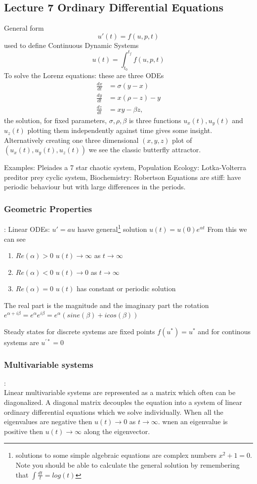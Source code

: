 \subsection{Lecture 7 Ordinary Differential Equations} General form
\[u'(t) = f(u,p,t)\]
used to define Continuous Dynamic Systems
\[u(t) = \int^{t_f}_{t_0}  f(u,p,t)\]
To solve the Lorenz equations: these are three ODEs
\[\begin{array}{rl}
\frac{dx}{dt} &= \sigma(y-x) \\
\frac{dy}{dt} &= x(\rho-z)-y \\
\frac{dz}{dt} &= xy-\beta z,
\end{array} \]
the solution, for fixed parameters, $\sigma,\rho,\beta$  is three functions $u_x(t),u_y(t)$ and $u_z(t)$ plotting them independently against time gives some insight. Alternatively creating one three dimensional $(x,y,z)$  plot of $(u_x(t),u_y(t),u_z(t))$ we see the classic  butterfly attractor.

Examples: Pleiades  a 7 star chaotic system, Population Ecology: Lotka-Volterra preditor prey  cyclic system, Biochemistry: Robertson Equations are stiff: have  periodic behaviour but with  large differences in the periods.



\subsubsection*{Geometric Properties}:
Linear ODEs: $u'= au$ hasve general\footnote{solutions to some simple algebraic equations are complex numbers $x^2 +1 = 0$. Note you should be able to calculate the general solution by remembering that $\int\frac{dt}{t}= log(t)$} 
solution $u(t) = u(0)e^{\alpha t}$ From this we can see
\begin{enumerate}
\item $Re(\alpha)> 0 $ $u(t)\rightarrow \infty$ as $t \rightarrow \infty$
\item $Re(\alpha)< 0 $ $u(t)\rightarrow 0$ as $t \rightarrow \infty$
\item $Re(\alpha)= 0 $ $u(t)$ has constant or periodic solution
\end{enumerate}
The real part is the magnitude and the imaginary part the rotation $e^{\alpha+i\beta} =e^{\alpha}e^{i\beta} = e^{\alpha}(sine(\beta)+ i cos(\beta))$

Steady states for discrete systems are fixed points $f(u^*)= u^*$ and for continous systems are $u^{\prime *} = 0$


\subsubsection*{Multivariable systems}:\\
Linear multivariable  systems are represented as a matrix which often can be diagonalized.
A diagonal matrix decouples the equation into a system of linear ordinary differential equations which we solve individually. 
When all the eigenvalues are negative then $u(t)\rightarrow 0$ as $t \rightarrow \infty$. wnen an eigenvalue is positive then  $u(t)\rightarrow \infty$  along the eigenvector.

